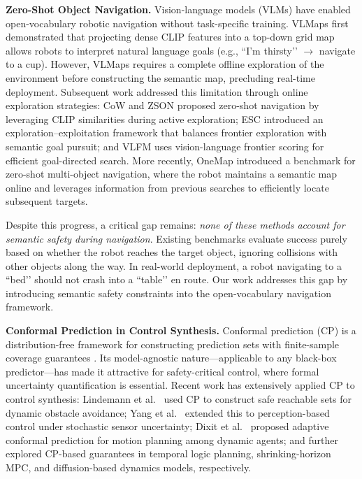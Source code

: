 \documentclass[letterpaper, 10 pt, conference]{ieeeconf}  %
\begin{document}
\textbf{Zero-Shot Object Navigation.}
Vision-language models (VLMs) have enabled open-vocabulary robotic navigation without task-specific training. VLMaps \cite{huang2023vlmaps} first demonstrated that projecting dense CLIP \cite{radford2021learning} features into a top-down grid map allows robots to interpret natural language goals (e.g., ``I’m thirsty’’ $\to$ navigate to a cup). However, VLMaps requires a complete offline exploration of the environment before constructing the semantic map, precluding real-time deployment. Subsequent work addressed this limitation through online exploration strategies: CoW \cite{gadre2023cows} and ZSON \cite{majumdar2022zson} proposed zero-shot navigation by leveraging CLIP similarities during active exploration; ESC \cite{zhou2023esc} introduced an exploration--exploitation framework that balances frontier exploration with semantic goal pursuit; and VLFM \cite{yokoyama2024vlfm} uses vision-language frontier scoring for efficient goal-directed search. More recently, OneMap \cite{reed2024onemap} introduced a benchmark for zero-shot multi-object navigation, where the robot maintains a semantic map online and leverages information from previous searches to efficiently locate subsequent targets.

Despite this progress, a critical gap remains: \textit{none of these methods account for semantic safety during navigation}. Existing benchmarks evaluate success purely based on whether the robot reaches the target object, ignoring collisions with other objects along the way. In real-world deployment, a robot navigating to a ``bed’’ should not crash into a ``table’’ en route. Our work addresses this gap by introducing semantic safety constraints into the open-vocabulary navigation framework.

\textbf{Conformal Prediction in Control Synthesis.}
Conformal prediction (CP) is a distribution-free framework for constructing prediction sets with finite-sample coverage guarantees \cite{shafer2008tutorial}. Its model-agnostic nature---applicable to any black-box predictor---has made it attractive for safety-critical control, where formal uncertainty quantification is essential.
Recent work has extensively applied CP to control synthesis: Lindemann et al.\ \cite{lindemann2023safe} used CP to construct safe reachable sets for dynamic obstacle avoidance; Yang et al.\ \cite{yang2023safe} extended this to perception-based control under stochastic sensor uncertainty; Dixit et al.\ \cite{dixit2023adaptive} proposed adaptive conformal prediction for motion planning among dynamic agents; and \cite{yu2023,stamouli2024recursively,sun2024conformal} further explored CP-based guarantees in temporal logic planning, shrinking-horizon MPC, and diffusion-based dynamics models, respectively.
\end{document}
